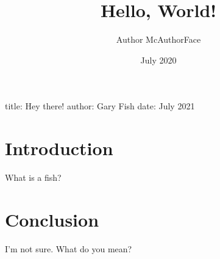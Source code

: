 \documentclass{article}
\title{Hello, World!}
\author{Author McAuthorFace}
\date{July 2020}
\begin{document}
\maketitle

title: Hey there!
author: Gary Fish
date: July 2021

\section{Introduction}

What is a fish?

\section{Conclusion}

I'm not sure.
What do you mean?
\end{document}
